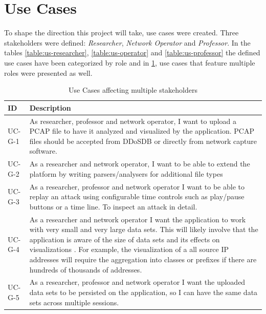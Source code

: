 \section{Use Cases}
\label{sec:usecases}
To shape the direction this project will take, use cases were created. Three stakeholders were defined: \emph{Researcher}, \emph{Network Operator} and \emph{Professor}. In the tables \ref{table:us-researcher}, \ref{table:us-operator} and \ref{table:us-professor} the defined use cases have been categorized by role and in \ref{table:us-general}, use cases that feature multiple roles were presented as well.

\begin{table}[]
\centering
\begin{tabular}{|p{1.6cm}|p{12cm}|}
\hline
\textbf{ID} & \textbf{Description} \\ \hline

UC-G-1         & As researcher, professor and network operator, I want to upload a PCAP file to have it analyzed and  visualized by the application. PCAP files should be accepted from DDoSDB or directly from network capture software.\\ \hline
UC-G-2         & As a researcher and network operator, I want to be able to extend the platform by writing parsers/analysers for additional file types\\ \hline
UC-G-3         & As a researcher, professor and network operator I want to be able to replay an attack using configurable time controls such as play/pause buttons or a time line. To inspect an attack in detail.\\ \hline
UC-G-4       & As a researcher and network operator I want the application to work with very small and very large data sets. This will likely involve that the application is aware of the size of data sets and its effects on visualizations \cite{appliedsecurityvisualization}. For example, the visualization of a all source IP addresses will require the aggregation into classes or prefixes if there are hundreds of thousands of addresses.\\ \hline
UC-G-5         & As a researcher, professor and network operator I want the uploaded data sets to be persisted on the application, so I can have the same data sets across multiple sessions.\\ \hline

\end{tabular}
\caption{Use Cases affecting multiple stakeholders}
\label{table:us-general}
\end{table} 


